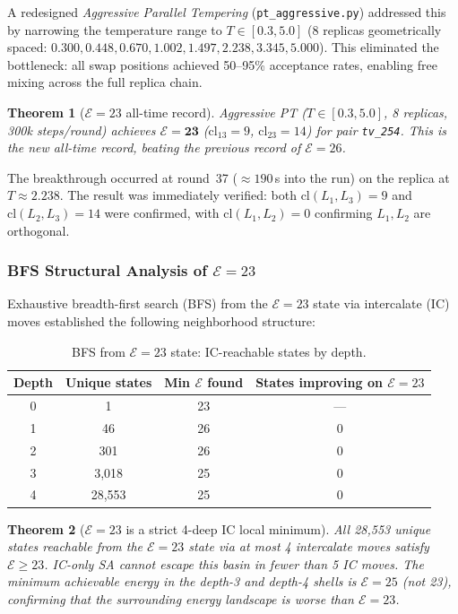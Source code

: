 \documentclass[11pt,a4paper]{article}
\newtheorem{theorem}{Theorem}[section]
\theoremstyle{remark}
\newcommand{\cl}{\mathrm{cl}}
\newcommand{\E}{\mathcal{E}}
\begin{document}
A redesigned \emph{Aggressive Parallel Tempering} (\texttt{pt\_aggressive.py}) addressed
this by narrowing the temperature range to $T \in [0.3, 5.0]$ (8 replicas geometrically
spaced: $0.300, 0.448, 0.670, 1.002, 1.497, 2.238, 3.345, 5.000$). This eliminated
the bottleneck: all swap positions achieved 50--95\% acceptance rates, enabling
free mixing across the full replica chain.

\begin{theorem}[$\E=23$ all-time record]\label{thm:e23}
Aggressive PT ($T \in [0.3, 5.0]$, 8 replicas, 300k steps/round) achieves
$\E = \mathbf{23}$ ($\cl_{13}=9$, $\cl_{23}=14$) for pair \texttt{tv\_254}.
This is the new all-time record, beating the previous record of $\E=26$.
\end{theorem}

The breakthrough occurred at round~37 ($\approx 190$\,s into the run) on the replica
at $T \approx 2.238$. The result was immediately verified: both $\cl(L_1, L_3) = 9$
and $\cl(L_2, L_3) = 14$ were confirmed, with $\cl(L_1, L_2) = 0$ confirming $L_1,
L_2$ are orthogonal.

\subsubsection{BFS Structural Analysis of $\E=23$}

Exhaustive breadth-first search (BFS) from the $\E=23$ state via intercalate (IC) moves
established the following neighborhood structure:

\begin{table}[h]
\centering
\caption{BFS from $\E=23$ state: IC-reachable states by depth.}\label{tab:e23bfs}
\begin{tabular}{cccc}
\toprule
Depth & Unique states & Min $\E$ found & States improving on $\E=23$\\
\midrule
0 & 1 & 23 & ---\\
1 & 46 & 26 & 0\\
2 & 301 & 26 & 0\\
3 & 3{,}018 & 25 & 0\\
4 & 28{,}553 & 25 & 0\\
\bottomrule
\end{tabular}
\end{table}

\begin{theorem}[$\E=23$ is a strict 4-deep IC local minimum]\label{thm:e23localmin}
All 28,553 unique states reachable from the $\E=23$ state via at most 4 intercalate
moves satisfy $\E \geq 23$. IC-only SA cannot escape this basin in fewer than 5 IC moves.
The minimum achievable energy in the depth-3 and depth-4 shells is $\E=25$ (not 23),
confirming that the surrounding energy landscape is \emph{worse} than $\E=23$.
\end{theorem}
\end{document}
